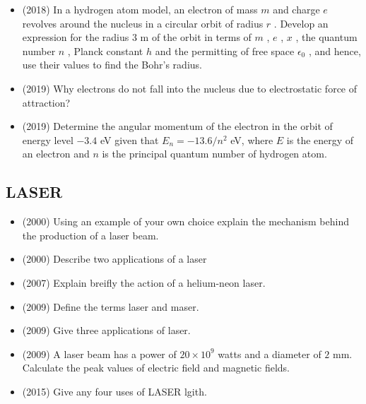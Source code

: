 \documentclass{article}
\begin{document}
\begin{itemize}
\item (2018)  In a hydrogen atom model, an electron of mass $ m$ and charge $ e$ revolves around the nucleus in a circular orbit of radius $ r$ . Develop an expression for the radius $ 3$ m of the orbit in terms of $ m$ , $ e$ , $ x$ , the quantum number $ n$ , Planck constant $ h$ and the permitting of free space $ \epsilon _{0}$ , and hence, use their values to find the Bohr’s radius. 
\item (2019)  Why electrons do not fall into the nucleus due to electrostatic force of attraction?
\item (2019)  Determine the angular momentum of the electron in the orbit of energy level $ -3.4$ eV given that $ E_{n}=-13.6/n^{2}$ eV, where $ E$ is the energy of an electron and $ n$ is the principal quantum number of hydrogen atom. 
\end{itemize}

\subsection{LASER}
\begin{itemize}
\item (2000)  Using an example of your own choice explain the mechanism behind the production of a laser beam.
\item (2000)  Describe two applications of a laser
\item (2007)  Explain breifly the action of a helium-neon laser.
\item (2009)  Define the terms laser and maser. 
\item (2009)  Give three applications of laser. 
\item (2009)  A laser beam has a power of $ 20 \times 10^{9}$ watts and a diameter of $ 2$ mm.  Calculate the peak values of electric field and magnetic fields.
\item (2015)  Give any four uses of LASER lgith.
\end{itemize}
\end{document}
